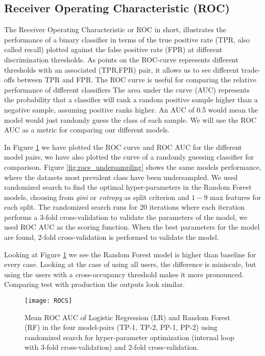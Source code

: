 \subsection{Receiver Operating Characteristic (ROC)}
The Receiver Operating Characteristic or ROC in short, illustrates the performance of a binary classifier in terms of the true positive rate (TPR, also called recall) plotted against the false positive rate (FPR) at different discrimination thresholds. As points on the ROC-curve represents different thresholds with an associated (TPR,FPR) pair, it allows us to see different trade-offs between TPR and FPR. The ROC curve is useful for comparing the relative performance of different classifiers\cite{tan2006introduction} The area under the curve (AUC) represents the probability that a classifier will rank a random positive sample higher than a negative sample, assuming positive ranks higher. An AUC of 0.5 would mean the model would just randomly guess the class of each sample. We will use the ROC AUC as a metric for comparing our different models.

In Figure \ref{fig:rocs} we have plotted the ROC curve and ROC AUC for the different model pairs, we have also plotted the curve of a randomly guessing classifier for comparison. Figure \ref{fig:rocs_undersampling} shows the same models performance, where the datasets most prevalent class have been undersampled. We used randomized search to find the optimal hyper-parameters in the Random Forest models, choosing from \textit{gini} or \textit{entropy} as split criterion and $1-9$ max features for each split. The randomized search runs for 20 iterations where each iteration performs a 3-fold cross-validation to validate the parameters of the model, we used ROC AUC as the scoring function. When the best parameters for the model are found, 2-fold cross-validation is performed to validate the model.

Looking at Figure \ref{fig:rocs} we see the Random Forest model is higher than baseline for every case. Looking at the case of using all users, the difference is miniscule, but using the users with a cross-occupancy threshold makes it more pronounced. Comparing test with production the outputs look similar.

\begin{figure}[H]
    \hspace*{-1.0cm}
    \centering
    \texttt{[image: ROCS]}
    \caption{Mean ROC AUC of Logistic Regression (LR) and Random Forest (RF) in the four model-pairs (TP-1, TP-2, PP-1, PP-2) using randomized search for hyper-parameter optimization (internal loop with 3-fold cross-validation) and 2-fold cross-validation. }
    \label{fig:rocs}
\end{figure}

